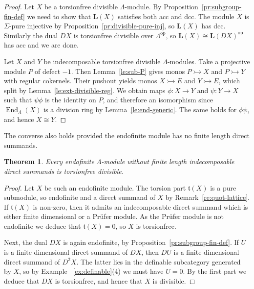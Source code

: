 \documentclass[a4paper]{amsart}
\theoremstyle{plain}
\newtheorem{thm}{Theorem}[section]
\theoremstyle{definition}
\theoremstyle{remark}
\numberwithin{equation}{section}
\newcommand{\End}{\operatorname{End}}
\newcommand{\op}{\mathrm{op}}
\def\bfL{\mathbf L}
\def\bfL{\mathbf L}
\newcommand{\frt}{\mathfrak t}
\begin{document}
\begin{proof}
Let $X$ be a torsionfree divisible $\Lambda$-module. By Proposition~\ref{pr:subgroup-fin-def} we need to show that
$\bfL(X)$ satisfies both acc and dcc. The module $X$ is $\Sigma$-pure injective by Proposition~\ref{pr:divisible-pure-inj}, so $\bfL(X)$ has dcc. Similarly the dual $DX$ is torsionfree divisible over $\Lambda^\op$, so $\bfL(X)\cong\bfL(DX)^\op$ has acc and we are done.

Let $X$ and $Y$ be indecomposable torsionfree divisible $\Lambda$-modules. Take a projective module $P$ of defect $-1$. Then Lemma~\ref{le:sub-P} gives monos $P\rightarrowtail X$ and $P\rightarrowtail Y$ with regular cokernels. Their pushout yields monos $X\rightarrowtail E$ and $Y\rightarrowtail E$, which split by Lemma~\ref{le:ext-divisible-reg}. We obtain maps $\phi\colon X\to Y$ and $\psi\colon Y\to X$ such that $\psi\phi$ is the identity on $P$, and therefore an isomorphism since
$\End_\Lambda(X)$ is a division ring by Lemma~\ref{le:end-generic}. The same holds for $\phi\psi$, and hence $X\cong Y$.
\end{proof}

The converse also holds provided the endofinite module has no finite length direct summands.

\begin{thm}\label{th:endofinite2}
Every endofinite $\Lambda$-module without finite length indecomposable direct summands is torsionfree divisible.
\end{thm}

\begin{proof}
Let $X$ be such an endofinite module. The torsion part $\frt(X)$ is a pure submodule, so endofinite and a direct summand of $X$ by Remark~\ref{re:quot-lattice}. If $\frt(X)$ is non-zero, then it admits an indecomposable direct summand which is either finite dimensional or a Prüfer module. As the Prüfer module is not endofinite we deduce that $\frt(X)=0$, so $X$ is torsionfree.

Next, the dual $DX$ is again endofinite, by Proposition~\ref{pr:subgroup-fin-def}. If $U$ is a finite dimensional direct summand of $DX$, then $DU$ is a finite dimensional direct summand of $D^2X$. The latter lies in the definable subcategory generated by $X$, so by Example ~\ref{ex:definable}(4) we must have $U=0$. By the first part we deduce that $DX$ is torsionfree, and hence that $X$ is divisible.
\end{proof}
\end{document}
